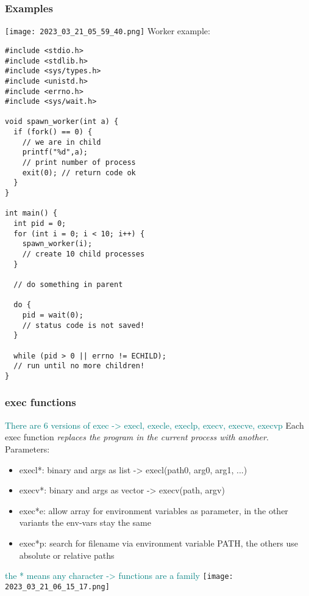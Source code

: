 \documentclass[main.tex,fontsize=8pt,paper=a4,paper=portrait,DIV=calc,]{scrartcl}
\begin{document}
\subsubsection{Examples}
\texttt{[image: 2023\_03\_21\_05\_59\_40.png]}\newline
Worker example:
\begin{lstlisting}
#include <stdio.h>
#include <stdlib.h>
#include <sys/types.h>
#include <unistd.h>
#include <errno.h>
#include <sys/wait.h>

void spawn_worker(int a) {
  if (fork() == 0) {
    // we are in child
    printf("%d",a);
    // print number of process
    exit(0); // return code ok
  }
}

int main() {
  int pid = 0;
  for (int i = 0; i < 10; i++) {
    spawn_worker(i);
    // create 10 child processes
  }

  // do something in parent

  do {
    pid = wait(0);
    // status code is not saved!
  }

  while (pid > 0 || errno != ECHILD);
  // run until no more children!
}
\end{lstlisting}

\subsubsection{exec functions}
\textcolor{teal}{There are 6 versions of exec -> execl, execle, execlp, execv, execve, execvp}\newline
Each exec function \emph{replaces the program in the current process with another}.\newline
Parameters:
\begin{itemize}
\item \textcolor{color}{execl*: binary and args as list -> execl(path0, arg0, arg1, ...)}
\item \textcolor{color}{execv*: binary and args as vector -> execv(path, argv)}
\item \textcolor{color}{exec*e: allow array for environment variables as parameter, in the other variants the env-vars stay the same}
\item \textcolor{color}{exec*p: search for filename via environment variable PATH, the others use absolute or relative paths}
\end{itemize} 
\textcolor{teal}{the * means any character -> functions are a family}\newline
\texttt{[image: 2023\_03\_21\_06\_15\_17.png]}
\end{document}
